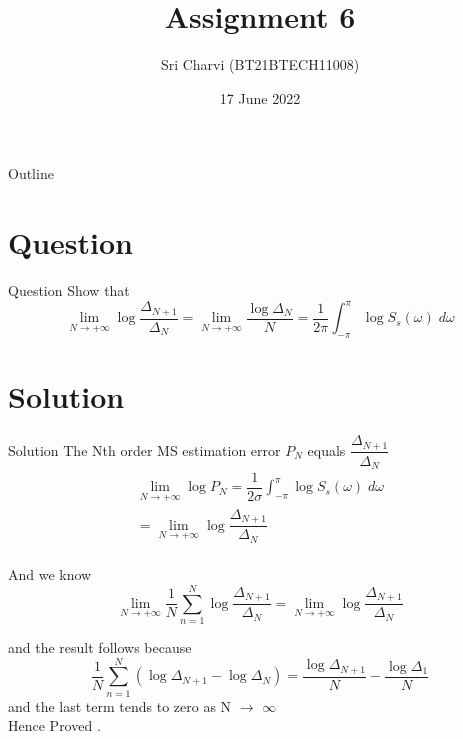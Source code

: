 \documentclass{beamer}
\title{Assignment 6}
\author{Sri Charvi (BT21BTECH11008)}
\date{17 June 2022}
\begin{document}
	
	\begin{frame}
		\titlepage 
	\end{frame}
	
	\logo{}
	
	
	\begin{frame}{Outline}
		\tableofcontents
	\end{frame}
	
	\section{Question}
	\begin{frame}{Question}
		Show that \\
		\begin{equation*}
			\lim_{N \to +\infty} \log \dfrac{\Delta_{N+1}}{\Delta_{N}}=\lim_{N \to +\infty} \dfrac{\log \Delta_{N}}{{N}}=\dfrac{1}{2\pi}\int_{-\pi}^{\pi}\log S_{s}(\omega)\;d\omega
		\end{equation*}
	\end{frame}
	
	
	\section{Solution}
	\begin{frame}{Solution}
		The Nth order MS estimation error $ P_{N} $ equals $
		 \dfrac{\Delta_{N+1}}{\Delta_{N}} $\\
		 \begin{eqnarray}
		 	 \lim_{N \to +\infty} \log P_{N}=\dfrac{1}{2\sigma}\int_{-\pi}^{\pi}\log S_{s}(\omega)\;d\omega \\
		 	 =\lim_{N \to +\infty} \log \dfrac{\Delta_{N+1}}{\Delta_{N}}
		 \end{eqnarray}\\
	 And we know \\
	 \begin{equation}
	 		\lim_{N \to +\infty} \dfrac{1}{N} \sum_{n=1}^{N} \log \dfrac{\Delta_{N+1}}{\Delta_{N}} =\lim_{N \to +\infty} \log \dfrac{\Delta_{N+1}}{\Delta_{N}}
	 \end{equation}
	  
	\end{frame} 
	
	\begin{frame}
	and the result follows because 
	\begin{equation}
		\dfrac{1}{N} \sum_{n=1}^{N} (\log \Delta_{N+1} - \log \Delta_{N} )=\dfrac{\log \Delta_{N+1}}{{N}}  - \dfrac{\log \Delta_{1}}{{N}}
	\end{equation}
and the last term tends to zero as N $\to$ $\infty$\\
 Hence Proved .
	\end{frame}
\end{document}
